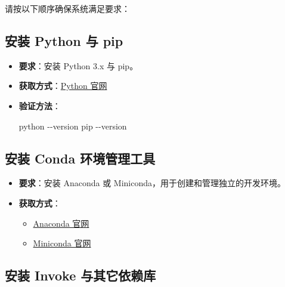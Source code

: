 \documentclass[
  letterpaper,
  DIV=11,
  numbers=noendperiod]{scrreprt}
\newenvironment{Shaded}{\begin{snugshade}}{\end{snugshade}}
\newcommand{\AttributeTok}[1]{\textcolor[rgb]{0.40,0.45,0.13}{#1}}
\newcommand{\ExtensionTok}[1]{\textcolor[rgb]{0.00,0.23,0.31}{#1}}
\providecommand{\tightlist}{%
  \setlength{\itemsep}{0pt}\setlength{\parskip}{0pt}}\usepackage{longtable,booktabs,array}
\begin{document}
请按以下顺序确保系统满足要求：

\subsection{安装 Python 与 pip}\label{ux5b89ux88c5-python-ux4e0e-pip}

\begin{itemize}
\item
  \textbf{要求}：安装 Python 3.x 与 pip。\\
\item
  \textbf{获取方式}：\href{https://www.python.org/downloads/}{Python
  官网}\\
\item
  \textbf{验证方法}：

\begin{Shaded}
\begin{Highlighting}[]
\ExtensionTok{python} \AttributeTok{{-}{-}version}
\ExtensionTok{pip} \AttributeTok{{-}{-}version}
\end{Highlighting}
\end{Shaded}
\end{itemize}

\subsection{安装 Conda
环境管理工具}\label{ux5b89ux88c5-conda-ux73afux5883ux7ba1ux7406ux5de5ux5177}

\begin{itemize}
\tightlist
\item
  \textbf{要求}：安装 Anaconda 或
  Miniconda，用于创建和管理独立的开发环境。\\
\item
  \textbf{获取方式}：

  \begin{itemize}
  \tightlist
  \item
    \href{https://www.anaconda.com/products/individual}{Anaconda 官网}\\
  \item
    \href{https://docs.conda.io/en/latest/miniconda.html}{Miniconda
    官网}
  \end{itemize}
\end{itemize}

\subsection{安装 Invoke
与其它依赖库}\label{ux5b89ux88c5-invoke-ux4e0eux5176ux5b83ux4f9dux8d56ux5e93}
\end{document}
